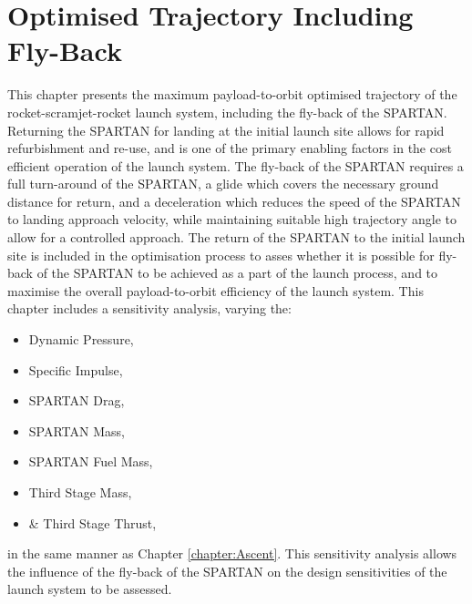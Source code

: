 
\cleardoublepage
\chapter{Optimised Trajectory Including Fly-Back}\label{chapter:Flyback}


This chapter presents the maximum payload-to-orbit optimised trajectory of the rocket-scramjet-rocket launch system, including the fly-back of the SPARTAN. 
 Returning the SPARTAN for landing at the initial launch site allows for rapid refurbishment and re-use, and is one of the primary enabling factors in the cost efficient operation of the launch system. 
The fly-back of the SPARTAN requires a full turn-around of the SPARTAN, a glide which covers the necessary ground distance for return, and a deceleration which reduces the speed of the SPARTAN to landing approach velocity, while maintaining suitable high trajectory angle to allow for a controlled approach. 
The return of the SPARTAN to the initial launch site is included in the optimisation process to asses whether it is possible for fly-back of the SPARTAN to be achieved as a part of the launch process, and to maximise the overall payload-to-orbit efficiency of the launch system. 
This chapter includes a sensitivity analysis, varying the:
 \begin{itemize}
	\item Dynamic Pressure,
	\item Specific Impulse,
	\item SPARTAN Drag,
	\item SPARTAN Mass,
	\item SPARTAN Fuel Mass,
	\item Third Stage Mass,
	\item \& Third Stage Thrust,
\end{itemize}
in the same manner as Chapter \ref{chapter:Ascent}. 
This sensitivity analysis allows the influence of the fly-back of the SPARTAN on the design sensitivities of the launch system to be assessed.


